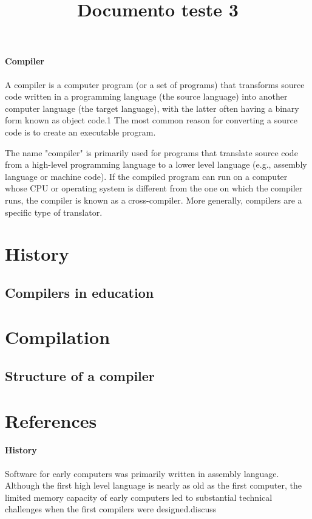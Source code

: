 \documentclass{article}
\title{Documento teste 3}
\begin{document}
\paragraph{Compiler}
A compiler is a computer program (or a set of programs) that transforms source code written in a programming language (the source language) into another computer language (the target language), with the latter often having a binary form known as object code.1 The most common reason for converting a source code is to create an executable program.

The name "compiler" is primarily used for programs that translate source code from a high-level programming language to a lower level language (e.g., assembly language or machine code). If the compiled program can run on a computer whose CPU or operating system is different from the one on which the compiler runs, the compiler is known as a cross-compiler. More generally, compilers are a specific type of translator.

\section{History}

\subsection{Compilers in education}

\section{Compilation}

\subsection{Structure of a compiler}

\section{References}

\paragraph{History}

Software for early computers was primarily written in assembly language. Although the first high level language is nearly as old as the first computer, the limited memory capacity of early computers led to substantial technical challenges when the first compilers were designed.discuss
\end{document}

